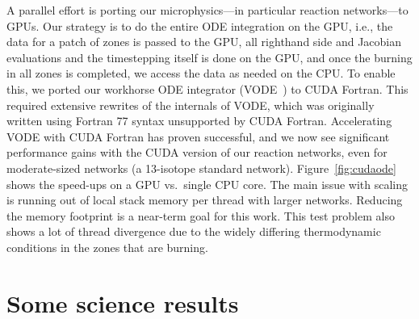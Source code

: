 \documentclass[a4paper]{jpconf}
\begin{document}
A parallel effort is porting our microphysics---in particular
reaction networks---to GPUs.  Our strategy is to do the entire ODE
integration on the GPU, i.e., the data for a patch of zones is passed
to the GPU, all righthand side and Jacobian evaluations and the
timestepping itself is done on the GPU, and once the burning in all
zones is completed, we access the data as needed on the CPU.  To
enable this, we ported our workhorse ODE integrator (VODE~\cite{vode})
to CUDA Fortran. This required extensive rewrites of the internals of
VODE, which was originally written using Fortran 77 syntax unsupported
by CUDA Fortran. Accelerating VODE with CUDA Fortran has proven
successful, and we now see significant performance gains with the CUDA
version of our reaction networks, even for moderate-sized networks (a
13-isotope standard network).  Figure~\ref{fig:cudaode} shows the
speed-ups on a GPU vs.\ single CPU core.  The main issue with scaling
is running out of local stack memory per thread with larger networks.
Reducing the memory footprint is a near-term goal for this work.  This
test problem also shows a lot of thread divergence due to the widely
differing thermodynamic conditions in the zones that are burning.



\section{Some science results}
\end{document}

